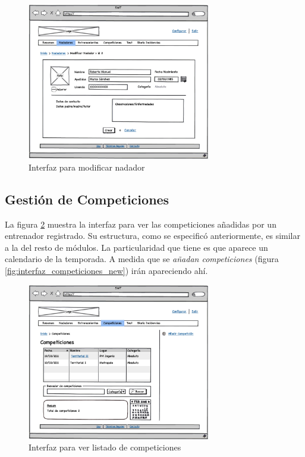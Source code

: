 	\begin{figure}[H]
	  \centering
	    \includegraphics[width=8cm]{./eps/13_Nadadores_modif.eps}
	  \caption{Interfaz para modificar nadador}
	  \label{fig:interfaz_nadadores_modif}
	\end{figure}
	
	\subsection{Gestión de Competiciones} %
		\label{sub:gestion_de_competiciones}
	
	La figura \ref{fig:interfaz_competiciones} muestra la interfaz para ver las competiciones añadidas por un entrenador registrado. Su estructura, como se especificó anteriormente, es similar a la del resto de módulos. La particularidad que tiene es que aparece un calendario de la temporada. A medida que se {\it añadan competiciones} (figura \ref{fig:interfaz_competiciones_new}) irán apareciendo ahí. 
	
		\begin{figure}[H]
		  \centering
		    \includegraphics[width=8cm]{./eps/14_Competiciones.eps}
		  \caption{Interfaz para ver listado de competiciones}
		  \label{fig:interfaz_competiciones}
		\end{figure}

